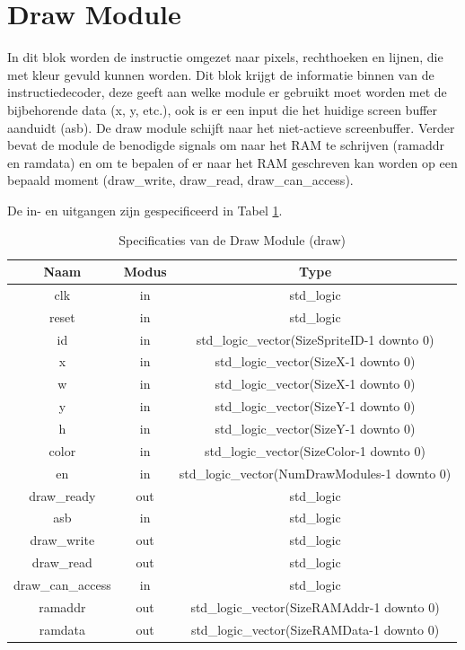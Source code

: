 \documentclass{scrartcl} %
\begin{document}
\section{Draw Module}
In dit blok worden de instructie omgezet naar pixels, rechthoeken en lijnen, die met kleur gevuld kunnen worden.
Dit blok krijgt de informatie binnen van de instructiedecoder, deze geeft aan welke module er gebruikt moet worden met de bijbehorende data (x, y, etc.), ook is er een input die het huidige screen buffer aanduidt (asb).
De draw module schijft naar het niet-actieve screenbuffer.
Verder bevat de module de benodigde signals om naar het RAM te schrijven (ramaddr en ramdata) en om te bepalen of er naar het RAM geschreven kan worden op een bepaald moment (draw\_write, draw\_read, draw\_can\_access).

De in- en uitgangen zijn gespecificeerd in Tabel \ref{tab:spec-draw}.

\begin{table}[H]
\centering
\caption{Specificaties van de Draw Module (draw)}
\label{tab:spec-draw}
\begin{tabular}{c c c}
	\hline\hline
 	Naam & Modus & Type\\
 	\hline	
	 clk & in & std\_logic \\
	 reset & in & std\_logic \\
	id & in & std\_logic\_vector(SizeSpriteID-1 downto 0) \\
	 x & in & std\_logic\_vector(SizeX-1 downto 0) \\ 
	 w & in & std\_logic\_vector(SizeX-1 downto 0) \\
	 y & in & std\_logic\_vector(SizeY-1 downto 0) \\
	 h & in & std\_logic\_vector(SizeY-1 downto 0) \\ 
	 color & in & std\_logic\_vector(SizeColor-1 downto 0) \\ 
	 en & in & std\_logic\_vector(NumDrawModules-1 downto 0) \\ 
	 draw\_ready & out & std\_logic \\
	 asb & in & std\_logic \\ 
	 draw\_write & out & std\_logic \\
	 draw\_read & out & std\_logic \\
	 draw\_can\_access & in & std\_logic \\
	 ramaddr & out & std\_logic\_vector(SizeRAMAddr-1 downto 0) \\
	 ramdata & out & std\_logic\_vector(SizeRAMData-1 downto 0) \\
  	\hline
\end{tabular}
\end{table}
\end{document}
